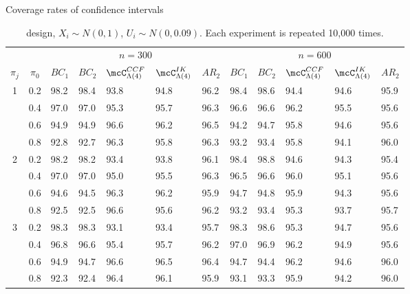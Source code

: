 \begin{table}[h!]
\small
\centering
\begin{threeparttable}
\caption{Coverage rates of confidence intervals}
\vspace{-0.5em}
\begin{tabularx}{\textwidth}{cc *{5}{Y} @{\hspace{1.5em}} *{5}{Y}}
\toprule
& &  &  \\
\cmidrule(r){3-7} \cmidrule(l){8-12}
$\pi_j$ & $\pi_0$ & $BC_1$ & $BC_2$ & $\mcC_{\Lambda(4)}^{CCF}$ & $\mcC_{\Lambda(4)}^{IK}$ & $AR_2$ &
$BC_1$ & $BC_2$ & $\mcC_{\Lambda(4)}^{CCF}$ & $\mcC_{\Lambda(4)}^{IK}$ & $AR_2$ \\
\hline
{} & 0.2 & 98.2 & 98.4 & 93.8 & 94.8 & 96.2 & 98.4 & 98.6 & 94.4 & 94.6 & 95.9 \\
& 0.4 & 97.0 & 97.0 & 95.3 & 95.7 & 96.3 & 96.6 & 96.6 & 96.2 & 95.5 & 95.6 \\
& 0.6 & 94.9 & 94.9 & 96.6 & 96.2 & 96.5 & 94.2 & 94.7 & 95.8 & 94.6 & 95.6 \\
& 0.8 & 92.8 & 92.7 & 96.3 & 95.8 & 96.3 & 93.2 & 93.4 & 95.8 & 94.1 & 96.0 \\
\hline
{} & 0.2 & 98.2 & 98.2 & 93.4 & 93.8 & 96.1 & 98.4 & 98.8 & 94.6 & 94.3 & 95.4 \\
& 0.4 & 97.0 & 97.0 & 95.0 & 95.5 & 96.3 & 96.5 & 96.6 & 96.0 & 95.1 & 95.6 \\
& 0.6 & 94.6 & 94.5 & 96.3 & 96.2 & 95.9 & 94.7 & 94.8 & 95.9 & 94.3 & 95.6 \\
& 0.8 & 92.5 & 92.5 & 96.6 & 95.6 & 96.2 & 93.2 & 93.4 & 95.3 & 93.7 & 95.7 \\
\hline
{} & 0.2 & 98.3 & 98.3 & 93.1 & 93.4 & 95.7 & 98.3 & 98.6 & 95.3 & 94.7 & 95.6 \\
& 0.4 & 96.8 & 96.6 & 95.4 & 95.7 & 96.2 & 97.0 & 96.9 & 96.2 & 94.9 & 95.6 \\
& 0.6 & 94.9 & 94.7 & 96.6 & 96.5 & 96.4 & 94.7 & 94.4 & 96.2 & 94.6 & 96.0 \\
& 0.8 & 92.3 & 92.4 & 96.4 & 96.1 & 95.9 & 93.1 & 93.3 & 95.9 & 94.2 & 96.0 \\
\bottomrule
\end{tabularx}
\caption*{\citet{lee2008randomized} design, $X_i \sim N(0,1)$, $U_i \sim N(0,0.09)$. Each experiment is repeated 10,000 times.}
\label{table inference lee normal concise}
\end{threeparttable}
\end{table}
